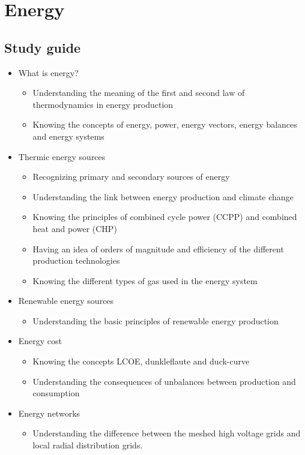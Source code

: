 \documentclass[../summary.tex]{subfiles}
\begin{document}
	
	\section{Energy}
	
	\subsection{Study guide}
	\begin{itemize} 
	\item What is energy?
		\begin{itemize} 
		\item Understanding the meaning of the first and second law of thermodynamics in energy production
		\item Knowing the concepts of energy, power, energy vectors, energy balances and energy systems
		\end{itemize}
	\item Thermic energy sources
		\begin{itemize} 
		\item Recognizing primary and secondary sources of energy
		\item Understanding the link between energy production and climate change
		\item Knowing the principles of combined cycle power (CCPP) and combined heat and power (CHP)
		\item Having an idea of orders of magnitude and efficiency of the different production technologies
		\item Knowing the different types of gas used in the energy system
		\end{itemize}
	\item Renewable energy sources
		\begin{itemize} 
		\item Understanding the basic principles of renewable energy production
		\end{itemize}
	\item Energy cost
		\begin{itemize} 
		\item Knowing the concepts LCOE, dunkleflaute and duck-curve
		\item Understanding the consequences of unbalances between production and consumption
		\end{itemize}
	\item Energy networks
		\begin{itemize} 
		\item Understanding the difference between the meshed high voltage grids and local radial distribution grids.

\end{itemize}
\end{itemize}
\end{document}

